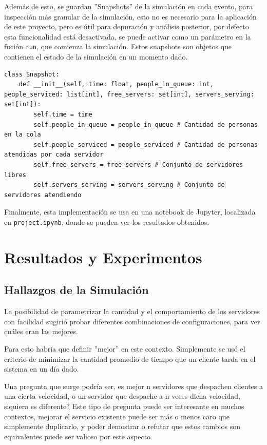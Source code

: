 \documentclass{article}
\begin{document}
Además de esto, se guardan ''Snapshots'' de la simulación en cada evento, para inspección más granular de la simulación, esto no es necesario para la aplicación de este proyecto, pero es útil para depuración y análisis posterior, por defecto esta funcionalidad está desactivada, se puede activar como un parámetro en la fución \texttt{run}, que comienza la simulación. Estos snapshots son objetos que contienen el estado de la simulación en un momento dado.

\begin{lstlisting}[style=python, caption={Clase Snapshot}]
class Snapshot:
    def __init__(self, time: float, people_in_queue: int, people_serviced: list[int], free_servers: set[int], servers_serving: set[int]):
        self.time = time
        self.people_in_queue = people_in_queue # Cantidad de personas en la cola
        self.people_serviced = people_serviced # Cantidad de personas atendidas por cada servidor
        self.free_servers = free_servers # Conjunto de servidores libres
        self.servers_serving = servers_serving # Conjunto de servidores atendiendo
\end{lstlisting}

Finalmente, esta implementación se usa en una notebook de Jupyter, localizada en \texttt{project.ipynb}, donde se pueden ver los resultados obtenidos.

\section{Resultados y Experimentos}
\subsection{Hallazgos de la Simulación}
La posibilidad de parametrizar la cantidad y el comportamiento de los servidores con facilidad sugirió probar diferentes combinaciones de configuraciones, para ver cuáles eran las mejores.

Para esto habría que definir ''mejor'' en este contexto. Simplemente se usó el criterio de minimizar la cantidad promedio de tiempo que un cliente tarda en el sistema en un día dado.

Una pregunta que surge podría ser, es mejor n servidores que despachen clientes a una cierta velocidad, o un servidor que despache a n veces dicha velocidad, siquiera es diferente? Este tipo de pregunta puede ser interesante en muchos contextos, mejorar el servicio existente puede ser más o menos caro que simplemente duplicarlo, y poder demostrar o refutar que estos cambios son equivalentes puede ser valioso por este aspecto.
\end{document}
